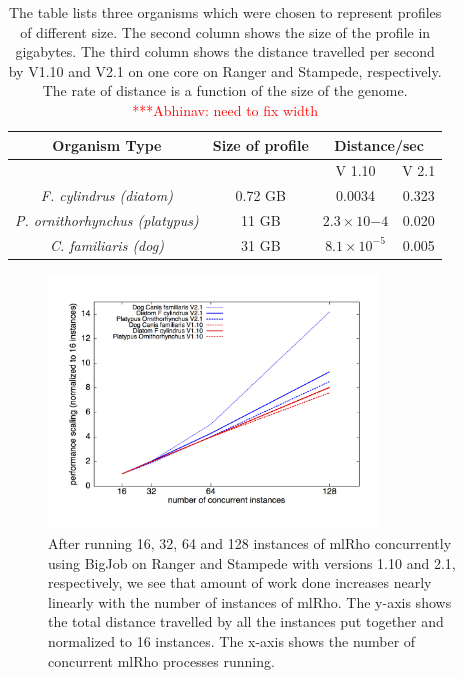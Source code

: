 \documentclass{sig-alternate}
\newcommand{\abhi}[1]{ {\textcolor{red} { ***Abhinav: #1 }}}
\newcommand{\abhi}[1]{ {}}
\begin{document}
\begin{table}
\centering
\begin{tabular}{|c|c| c |c  |     } \hline
Organism Type		& Size of profile& \multicolumn{2}{|c|}{Distance/sec}  \\ \hline
	&   & V 1.10 & V 2.1 \\ \hline
{\it F. cylindrus (diatom)}  & 0.72 GB & 0.0034 & 0.323 \\ \hline
{\it P. ornithorhynchus (platypus)}  & 11 GB &$2.3{\times}10{-4}$ & 0.020 \\ \hline
{\it C. familiaris (dog)}  & 31 GB & $8.1{\times}10^{-5}$ & 0.005 \\
\hline

\end{tabular}
\caption{The table lists three organisms which were chosen to represent profiles of different size. The second column shows the size of the profile in gigabytes. The third column shows the distance travelled per second by V1.10 and V2.1 on one core on Ranger and Stampede, respectively. The rate of distance is a function of the size of the genome. \abhi{need to fix width} } 
\label{table:cache_comp}
\end{table}

\begin{figure}[t] %
\centering
\includegraphics[width=0.78\textwidth]{figures/bj-scaling.png}
\caption{After running 16, 32, 64 and 128 instances of mlRho concurrently using BigJob on Ranger and Stampede with versions 1.10 and 2.1, respectively, we see that amount of work done increases nearly linearly with the number of instances of mlRho. The y-axis shows the total distance travelled by all the instances put together and normalized to 16 instances. The x-axis shows the number of concurrent mlRho processes running. }
\label{fig:bj-scaling}
\end{figure}
\end{document}
